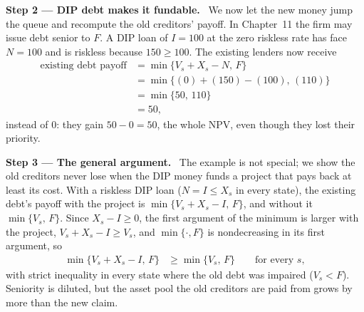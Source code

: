 \documentclass[11pt,a4paper]{article}
\newcommand{\step}[2]{\par\medskip\noindent\textbf{Step #1 --- #2.}~}
\begin{document}
\step{2}{DIP debt makes it fundable} We now let the new money jump the queue and recompute the
old creditors' payoff. In Chapter~11 the firm may issue debt senior to $F$. A DIP
loan of $I=100$ at the zero riskless rate has face $N=100$ and is riskless because
$150\ge 100$. The existing lenders now receive
\begin{align}
  \text{existing debt payoff} &= \min\{V_s+X_s-N,\,F\} \label{t4e1-old}\\
                              &= \min\{(0)+(150)-(100),\,(110)\} \nonumber\\
                              &= \min\{50,\,110\} \nonumber\\
                              &= 50, \nonumber
\end{align}
instead of $0$: they gain $50-0=50$, the whole NPV, even though they lost their priority.

\step{3}{The general argument} The example is not special; we show the old creditors never lose
when the DIP money funds a project that pays back at least its cost. With a riskless DIP loan ($N=I\le X_s$ in every state), the
existing debt's payoff with the project is $\min\{V_s+X_s-I,\,F\}$, and without it
$\min\{V_s,\,F\}$. Since $X_s-I\ge 0$, the first argument of the minimum is larger with the
project, $V_s+X_s-I\ge V_s$, and $\min\{\cdot,F\}$ is nondecreasing in its first argument, so
\begin{align}
  \min\{V_s+X_s-I,\,F\} &\ge \min\{V_s,\,F\} \qquad\text{for every } s, \label{t4e1-dom}
\end{align}
with strict inequality in every state where the old debt was impaired ($V_s<F$). Seniority is
diluted, but the asset pool the old creditors are paid from grows by more than the new claim.
\end{document}
